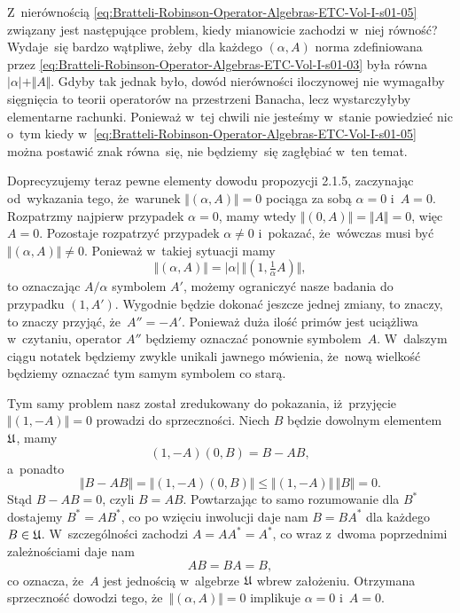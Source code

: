 \documentclass[a4paper,11pt]{article}
\begin{document}
Z~nierównością
\eqref{eq:Bratteli-Robinson-Operator-Algebras-ETC-Vol-I-s01-05} związany
jest następujące problem, kiedy mianowicie zachodzi w~niej równość?
Wydaje~się bardzo wątpliwe, żeby~dla każdego $( \alpha, A )$ norma zdefiniowana
przez \eqref{eq:Bratteli-Robinson-Operator-Algebras-ETC-Vol-I-s01-03} była
równa $| \alpha | + \Vert A \Vert$. Gdyby tak jednak było, dowód nierówności iloczynowej
nie wymagałby sięgnięcia to teorii operatorów na przestrzeni Banacha, lecz
wystarczyłyby elementarne rachunki. Ponieważ w~tej chwili nie jesteśmy
w~stanie powiedzieć nic o~tym kiedy
w~\eqref{eq:Bratteli-Robinson-Operator-Algebras-ETC-Vol-I-s01-05} można
postawić znak równa~się, nie będziemy~się zagłębiać w~ten temat.

Doprecyzujemy teraz pewne elementy dowodu propozycji 2.1.5, zaczynając
od~wykazania tego, że~warunek $\Vert ( \alpha, A ) \Vert = 0$ pociąga za sobą $\alpha = 0$
i~$A = 0$. Rozpatrzmy najpierw przypadek $\alpha = 0$, mamy wtedy
$\Vert ( 0, A ) \Vert = \Vert A \Vert = 0$, więc $A = 0$. Pozostaje rozpatrzyć przypadek
$\alpha \neq 0$ i~pokazać, że~wówczas musi być $\Vert ( \alpha, A ) \Vert \neq 0$. Ponieważ w~takiej
sytuacji mamy
\begin{equation}
  \label{eq:Bratteli-Robinson-Operator-Algebras-ETC-Vol-I-s01-11}
  \Vert ( \alpha, A ) \Vert = | \alpha | \, \Vert ( 1, \tfrac{ 1 }{ \alpha } A ) \Vert,
\end{equation}
to oznaczając $A / \alpha$ symbolem $A'$, możemy ograniczyć nasze badania
do przypadku $( 1, A' )$. Wygodnie będzie dokonać jeszcze jednej zmiany, to
znaczy, to znaczy przyjąć, że~$A'' = -A'$. Ponieważ duża ilość primów jest
uciążliwa w~czytaniu, operator $A''$ będziemy oznaczać ponownie
symbolem~$A$. W~dalszym ciągu notatek będziemy zwykle unikali jawnego
mówienia, że~nową wielkość będziemy oznaczać tym samym symbolem co starą.

Tym samy problem nasz został zredukowany do pokazania, iż~przyjęcie
$\Vert ( 1, -A ) \Vert = 0$ prowadzi do sprzeczności. Niech $B$ będzie dowolnym
elementem $\mathfrak{U}$, mamy
\begin{equation}
  \label{eq:Bratteli-Robinson-Operator-Algebras-ETC-Vol-I-s01-12}
  ( 1, -A ) ( 0, B ) = B - AB,
\end{equation}
a~ponadto
\begin{equation}
  \label{eq:Bratteli-Robinson-Operator-Algebras-ETC-Vol-I-s01-13}
  \Vert B - A B \Vert =
  \Vert ( 1, -A ) ( 0, B ) \Vert \leq
  \Vert ( 1, -A ) \Vert \, \Vert B \Vert = 0.
\end{equation}
Stąd $B - A B = 0$, czyli $B = A B$. Powtarzając to samo rozumowanie dla
$B^{ * }$ dostajemy $B^{ * } = A B^{ * }$, co po wzięciu inwolucji daje nam
$B = B A^{ * }$ dla każdego $B \in \mathfrak{U}$. W~szczególności zachodzi
$A = A A^{ * } = A^{ * }$, co wraz z~dwoma poprzednimi zależnościami daje nam
\begin{equation}
  \label{eq:Bratteli-Robinson-Operator-Algebras-ETC-Vol-I-s01-14}
  A B = B A = B,
\end{equation}
co oznacza, że~$A$ jest jednością w~algebrze $\mathfrak{U}$ wbrew założeniu.
Otrzymana sprzeczność dowodzi tego, że~$\Vert ( \alpha, A ) \Vert = 0$ implikuje
$\alpha = 0$ i~$A = 0$.
\end{document}
